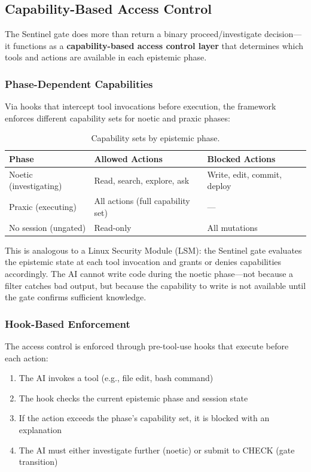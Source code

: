 \subsection{Capability-Based Access Control}

The Sentinel gate does more than return a binary proceed/investigate decision---it functions as a \textbf{capability-based access control layer} that determines which tools and actions are available in each epistemic phase.

\subsubsection{Phase-Dependent Capabilities}

Via hooks that intercept tool invocations before execution, the framework enforces different capability sets for noetic and praxic phases:

\begin{table}[h]
\centering
\begin{tabular}{lll}
\toprule
\textbf{Phase} & \textbf{Allowed Actions} & \textbf{Blocked Actions} \\
\midrule
Noetic (investigating) & Read, search, explore, ask & Write, edit, commit, deploy \\
Praxic (executing) & All actions (full capability set) & --- \\
No session (ungated) & Read-only & All mutations \\
\bottomrule
\end{tabular}
\caption{Capability sets by epistemic phase.}
\label{tab:capability-acl}
\end{table}

This is analogous to a Linux Security Module (LSM): the Sentinel gate evaluates the epistemic state at each tool invocation and grants or denies capabilities accordingly. The AI cannot write code during the noetic phase---not because a filter catches bad output, but because the capability to write is not available until the gate confirms sufficient knowledge.

\subsubsection{Hook-Based Enforcement}

The access control is enforced through pre-tool-use hooks that execute before each action:

\begin{enumerate}
    \item The AI invokes a tool (e.g., file edit, bash command)
    \item The hook checks the current epistemic phase and session state
    \item If the action exceeds the phase's capability set, it is blocked with an explanation
    \item The AI must either investigate further (noetic) or submit to CHECK (gate transition)
\end{enumerate}

